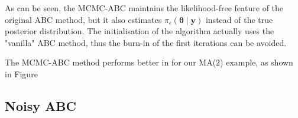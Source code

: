 \documentclass[runningheads]{llncs}
\begin{document}
As can be seen, the MCMC-ABC maintains the likelihood-free
feature of the original ABC method, but it also estimates
$\pi_\epsilon(\bm \theta \mid \bm y)$ instead of the true
posterior distribution. The initialisation of the algorithm
actually uses the "vanilla" ABC method, thus the burn-in
of the first iterations can be avoided.

The MCMC-ABC method performs better in for our MA(2) example, as shown
in Figure 

\subsection{Noisy ABC}
\label{subsec:statistical-summaries}

%
%
%


%
\end{document}
